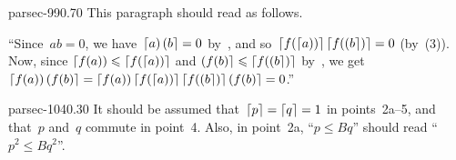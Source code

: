 \documentclass[b5page]{book}
\begin{document}
\begin{erratum}{parsec-990.70}
This paragraph should read as follows.

``Since~$ab=0$,
we have~$\left\lceil a\right)\left(b\right\rceil=0$ by~,
and so~$\left\lceil f(\left\lceil a\right))\right\rceil\left\lceil f(\left(b\right\rceil)\right\rceil=0$ (by~(3)).
Now,
since $\left\lceil f(a)\right)\leqslant \left\lceil f(\left\lceil a\right))\right\rceil$
and $\left(f(b)\right\rceil\leqslant \left\lceil f(\left(b\right\rceil)\right\rceil$
by~,
we get $\left\lceil f(a)\right)\left(f(b)\right\rceil
= \left\lceil f(a)\right) \left\lceil f(\left\lceil a\right))\right\rceil
\left\lceil f(\left(b\right\rceil)\right\rceil
\left(f(b)\right\rceil
=0$.''
\end{erratum}
\begin{erratum}{parsec-1040.30}
It should be assumed that~$\left\lceil p\right\rceil=\left\lceil q\right\rceil=1$
in points~2a--5,
and that~$p$ and~$q$ commute in point~4.
Also, in point~2a, ``$p\leq Bq$'' should read ``$p^2\leq Bq^2$''.
\end{erratum}
\end{document}
